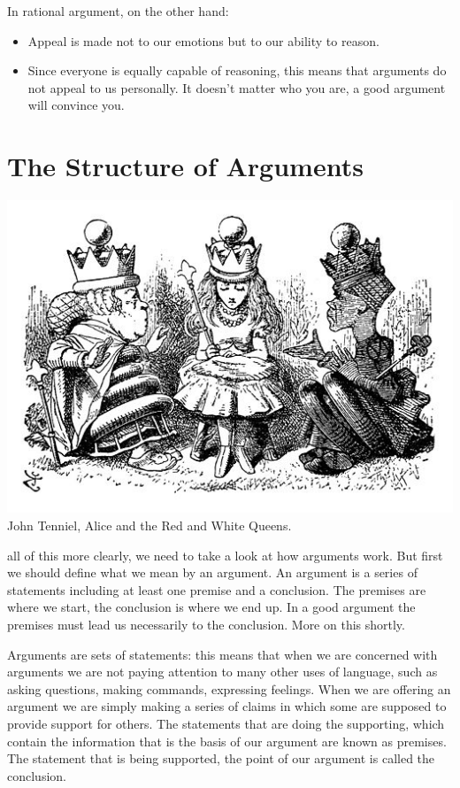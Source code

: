 \documentclass[justified]{tufte-book}
\begin{document}
In rational argument, on the other hand:

\begin{itemize}
\item
  Appeal is made not to our emotions but to our ability to reason.
\item
  Since everyone is equally capable of reasoning, this means that arguments do not appeal to us personally. It doesn't matter who you are, a good argument will convince you.
\end{itemize}

\hypertarget{the-structure-of-arguments}{%
\section{The Structure of Arguments}\label{the-structure-of-arguments}}

\begin{marginfigure}
\includegraphics{img/tenniel-alice-queens.jpg} John Tenniel, Alice and
the Red and White Queens.
\end{marginfigure}

 all of this more clearly, we need to take a look at how arguments work. But first we should define what we mean by an argument. An argument is a series of statements including at least one premise and a conclusion. The premises are where we start, the conclusion is where we end up. In a good argument the premises must lead us necessarily to the conclusion. More on this shortly.

Arguments are sets of statements: this means that when we are concerned with arguments we are not paying attention to many other uses of language, such as asking questions, making commands, expressing feelings. When we are offering an argument we are simply making a series of claims in which some are supposed to provide support for others. The statements that are doing the supporting, which contain the information that is the basis of our argument are known as premises. The statement that is being supported, the point of our argument is called the conclusion.
\end{document}
